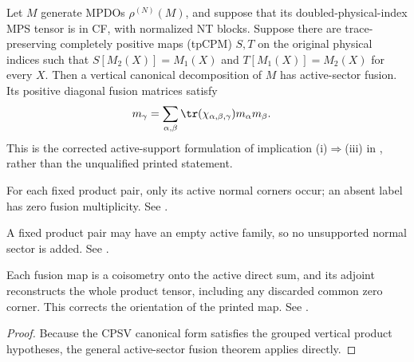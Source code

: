 \begin{lemma}%
    \label{thm:mpdo_literal_cpsv_rfp_to_bnt_fusion_tensor}
    \leanok
    Let $M$ generate MPDOs $\rho^{(N)}(M)$, and suppose that its
    doubled-physical-index MPS tensor is in CF, with normalized NT blocks.
    Suppose there are trace-preserving completely positive maps (tpCPM)
    $S,T$ on the original physical indices such that
    $S[M_2(X)]=M_1(X)$ and $T[M_1(X)]=M_2(X)$ for every $X$.
    Then a vertical canonical decomposition of $M$ has active-sector
    fusion. Its positive diagonal fusion matrices satisfy
    \begin{align}
        m_\gamma
         & =\sum_{\alpha,\beta}
        \tr(\chi_{\alpha,\beta,\gamma})m_\alpha m_\beta.
        \notag
    \end{align}
    This is the corrected active-support formulation of implication
    (i)$\Rightarrow$(iii) in
    \cite[Theorem~4.14, lines~972--993]{Cirac2016MPDO_arXiv}, rather than the
    unqualified printed statement.

    For each fixed product pair, only its active normal corners occur;
    an absent label has zero fusion multiplicity. See
    \cite{gap:cpsv16_bnt_uniqueness_zero_coefficient}.

    A fixed product pair may have an empty active family, so no
    unsupported normal sector is added. See
    \cite{gap:cpsv16_figure11_per_pair_support}.

    Each fusion map is a coisometry onto the active direct sum, and its
    adjoint reconstructs the whole product tensor, including any discarded
    common zero corner. This corrects the orientation of the printed map.
    See \cite{gap:cpsv16_figure11_fusion_coisometry}.
\end{lemma}

\begin{proof}\leanok
    Because the CPSV canonical form satisfies the grouped vertical product
    hypotheses, the general active-sector fusion theorem applies directly.
\end{proof}

